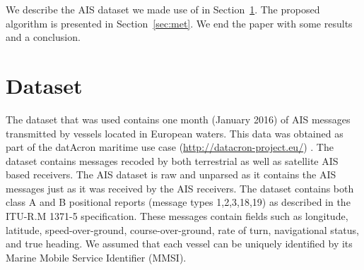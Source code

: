 \documentclass{article}
\begin{document}
 We describe the AIS dataset we made use of in Section~\ref{sec:data}. The proposed algorithm is presented in Section~\ref{sec:met}. We end the paper with some results and a conclusion.

% 
% 
% 
% 
 
\section{Dataset}
\label{sec:data}
The dataset that was used contains one month (January 2016) of AIS messages transmitted by vessels located in European waters. This data was
obtained as part of the datAcron maritime use case (\url{http://datacron-project.eu/}) \cite{vouros2017}.  
The dataset contains messages recoded by both terrestrial as well as satellite AIS based receivers. The AIS dataset is raw and unparsed as it contains the AIS messages 
just as it was received by the AIS receivers. The dataset contains both class A and B positional reports (message types 1,2,3,18,19)
as described in the ITU-R.M 1371-5 specification. These messages contain fields such as longitude, latitude,
speed-over-ground, course-over-ground, rate of turn, navigational status, and true heading. We assumed that each vessel
can be uniquely identified by its Marine Mobile Service Identifier (MMSI). 
\end{document}
